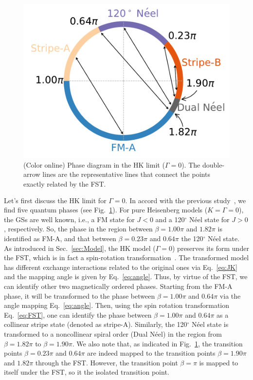 \documentclass[aps,prb,reprint,amsfonts,amsmath,amssymb,showpacs,groupedaddress,superscriptaddress]{revtex4-1}
\begin{document}
\begin{figure}
    \centering
    \includegraphics[width=\columnwidth]{fig/HKModel.pdf}
    \caption{\label{fig:HKModel}(Color online) Phase diagram in the HK limit ($\Gamma=0$). The double-arrow lines are the representative lines that connect the points exactly related by the FST.}
\end{figure}
Let's first discuss the HK limit for $\Gamma=0$. In accord with the previous study~\cite{KaiLi2015}, we find five quantum phases (see Fig.~\ref{fig:HKModel}). For pure Heisenberg models ($K=\Gamma=0$), the GSs are well known, i.e., a FM state for $J<0$ and a 120$^\circ$ N\'{e}el state for $J>0$, respectively. So, the phase in the region between $\beta=1.00\pi$ and $1.82\pi$ is identified as FM-A, and that between $\beta=0.23\pi$ and $0.64\pi$ the 120$^\circ$ N\'{e}el state. As introduced in Sec.~\ref{sec:Model}, the HK model ($\Gamma=0$) preserves its form under the FST, which is in fact a spin-rotation transformation~\cite{PhysRevB.89.014414}. The transformed model has different exchange interactions related to the original ones via Eq.~\eqref{eq:JK} and the mapping angle is given by Eq.~\eqref{eq:angle}. Thus, by virtue of the FST, we can identify other two magnetically ordered phases. Starting from the FM-A phase, it will be transformed to the phase between $\beta=1.00\pi$ and $0.64\pi$ via the angle mapping Eq.~\eqref{eq:angle}. Then, using the spin rotation transformation Eq.~\eqref{eq:FST}, one can identify the phase between $\beta=1.00\pi$ and $0.64\pi$ as a collinear stripe state (denoted as stripe-A). Similarly, the 120$^\circ$ N\'{e}el state is transformed to a noncollinear spiral order (Dual N\'{e}el) in the region from $\beta=1.82\pi$ to $\beta=1.90\pi$. We also note that, as indicated in Fig.~\ref{fig:HKModel}, the transition points $\beta=0.23\pi$ and $0.64\pi$ are indeed mapped to the transition points $\beta=1.90\pi$ and $1.82\pi$ through the FST. However, the transition point $\beta=\pi$ is mapped to itself under the FST, so it the isolated transition point.
\end{document}
